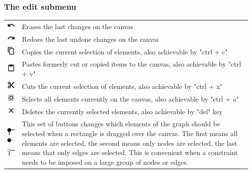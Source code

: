 \subsubsection{The edit submenu}
\begin{tabular}{p{}p{}}
 \includegraphics[scale=0.6]{figures/icons/undo.png} & Erases the last changes on the canvas\\
 \includegraphics[scale=0.6]{figures/icons/redo.png} & Redoes the last undone changes on the canvas\\
 \includegraphics[scale=0.6]{figures/icons/copy.png} & Copies the current selection of elements, also achievable by "ctrl + c"\\
 \includegraphics[scale=0.6]{figures/icons/paste.png} & Pastes formerly cut or copied items to the canvas, also achievable by "ctrl + v"\\
 \includegraphics[scale=0.6]{figures/icons/cut.png} & Cuts the current selection of elements, also achievable by "ctrl + x" \\
 \includegraphics[scale=0.6]{figures/icons/select_all.png} & 
Selects all elements currently on the canvas, also achievable by "ctrl + a"\\
\includegraphics[scale=0.6]{figures/icons/delete_all.png} & Deletes the currently selected elements, also achievable by "del" key\\[12pt]
\includegraphics[scale=0.6]{figures/icons/marquee_all.png}  \includegraphics[scale=0.6]{figures/icons/marquee_nodes.png}  \includegraphics[scale=0.6]{figures/icons/marquee_edges.png} & This set of buttons changes which elements of the graph should be selected when a rectangle is dragged over the canvas. The first means all elements are selected, the second means only nodes are selected, the last means that only edges are selected. This is convenient when a constraint needs to be imposed on a large group of nodes or edges.
\end{tabular}
